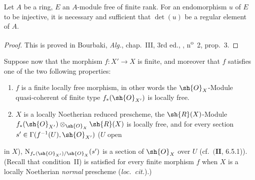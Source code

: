 \begin{lemma}[21.5.2]
\label{IV.21.5.2}
Let $A$ be a ring, $E$ an $A$-module free of finite rank.
For an endomorphism $u$ of $E$ to be injective, it is necessary and sufficient that $\det(u)$ be a regular element of $A$.
\end{lemma}

\begin{proof}
This is proved in Bourbaki, \emph{Alg.}, chap.~III, 3rd ed., , n\textsuperscript{o}~2, prop.~3.
\end{proof}

\begin{env}[21.5.3]
\label{IV.21.5.3}
Suppose now that the morphism $f:X'\to X$ is finite, and moreover that $f$ satisfies one of the two following properties:
\begin{enumerate}
  \item[I)] $f$ is a finite locally free morphism, in other words  the $\sh{O}_X$-Module quasi-coherent of finite type $f_*(\sh{O}_{X'})$ is locally free.
  \item[II)] $X$ is a locally Noetherian reduced prescheme, the $\sh{R}(X)$-Module $f_*(\sh{O}_{X'})\otimes_{\sh{O}_X}\sh{R}(X)$ is locally free, and for every section $s'\in\Gamma(f^{-1}(U),\sh{O}_{X'})$ ($U$ open
\end{enumerate}

in $X$), $\mathrm{N}_{f_*(\sh{O}_{X'})/\sh{O}_X}(s')$ is a section of $\sh{O}_X$ over $U$ (cf.\ $(\mathbf{II}$, 6.5.1)).
(Recall that condition~II) is satisfied for every finite morphism $f$ when $X$ is a locally Noetherian \emph{normal} prescheme (\emph{loc.~cit.}).)


\end{env}
